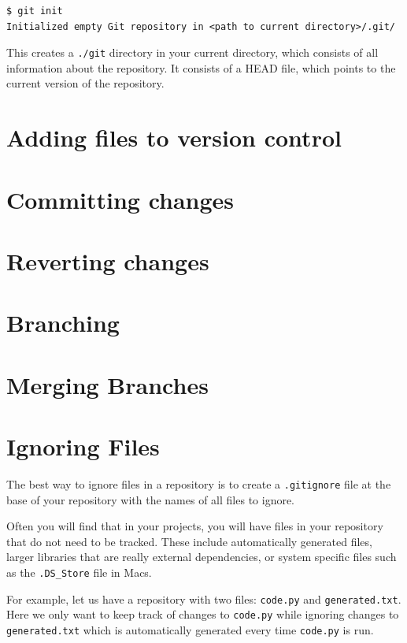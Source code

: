 \documentclass{amsart}
\begin{document}
\begin{verbatim}
$ git init
Initialized empty Git repository in <path to current directory>/.git/
\end{verbatim}

\bigskip
\noindent
This creates a \verb|./git| directory in your current directory, which consists of all information about the repository. It consists of a HEAD file, which points to the current version of the repository.


\newpage

\section*{Adding files to version control}

\section*{Committing changes}

\section*{Reverting changes}

\section*{Branching}

\section*{Merging Branches}

\newpage
\section*{Ignoring Files}

The best way to ignore files in a repository is to create a \texttt{.gitignore} file at the base of your repository with the names of all files to ignore.

Often you will find that in your projects, you will have files in your repository that do not need to be tracked.  These include automatically generated files, larger libraries that are really external dependencies, or system specific files such as the \texttt{.DS\_Store} file in Macs.

For example, let us have a repository with two files: \texttt{code.py} and \texttt{generated.txt}.  Here we only want to keep track of changes to \texttt{code.py} while ignoring changes to \texttt{generated.txt} which is automatically generated every time \texttt{code.py} is run.
\end{document}
